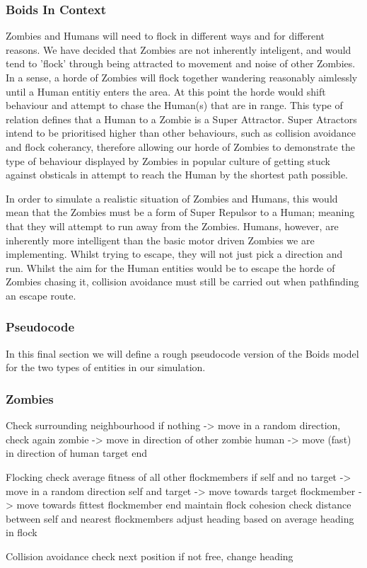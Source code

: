 \subsubsection{Boids In Context}
Zombies and Humans will need to flock in different ways and for different reasons. We have decided that Zombies are not inherently inteligent, and would tend to 'flock' through being attracted to movement and noise of other Zombies. In a sense, a horde of Zombies will flock together wandering reasonably aimlessly until a Human entitiy enters the area. At this point the horde would shift behaviour and attempt to chase the Human(s) that are in range. This type of relation defines that a Human to a Zombie is a Super Attractor. Super Atractors intend to be prioritised higher than other behaviours, such as collision avoidance and flock coherancy, therefore allowing our horde of Zombies to demonstrate the type of behaviour displayed by Zombies in popular culture of getting stuck against obsticals in attempt to reach the Human by the shortest path possible.

In order to simulate a realistic situation of Zombies and Humans, this would mean that the Zombies must be a form of Super Repulsor to a Human; meaning that they will attempt to run away from the Zombies. Humans, however, are inherently more intelligent than the basic motor driven Zombies we are implementing. Whilst trying to escape, they will not just pick a direction and run. Whilst the aim for the Human entities would be to escape the horde of Zombies chasing it, collision avoidance must still be carried out when pathfinding an escape route. 

\subsubsection{Pseudocode}
In this final section we will define a rough pseudocode version of the Boids model for the two types of entities in our simulation.

\subsubsection{Zombies}
Check surrounding neighbourhood
if	nothing 	->	move in a random direction, check again
	zombie 		->	move in direction of other zombie
	human 		->	move (fast) in direction of human target
end

Flocking
	check average fitness of all other flockmembers
	if 	self and no target 	->	move in a random direction
		self and target		-> 	move towards target
		flockmember 		-> 	move towards fittest flockmember
	end
	maintain flock cohesion
		check distance between self and nearest flockmembers
		adjust heading based on average heading in flock

Collision avoidance
	check next position
		if not free, change heading

